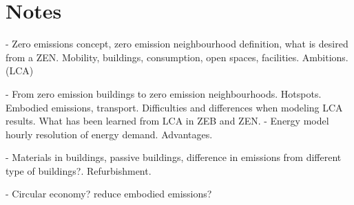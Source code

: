 \chapter{Notes} %


- Zero emissions concept, zero emission neighbourhood definition, what is desired from a ZEN. 
Mobility, buildings, consumption, open spaces, facilities. 
Ambitions. (LCA) 

- From zero emission buildings to zero emission neighbourhoods.
 Hotspots. Embodied emissions, transport. Difficulties and differences when modeling 
LCA results. What has been learned from LCA in ZEB and ZEN. 
		- Energy model hourly resolution of energy demand. Advantages. 

- Materials in buildings, passive buildings, difference in emissions from different type of buildings?. Refurbishment. 

- Circular economy? reduce embodied emissions? 